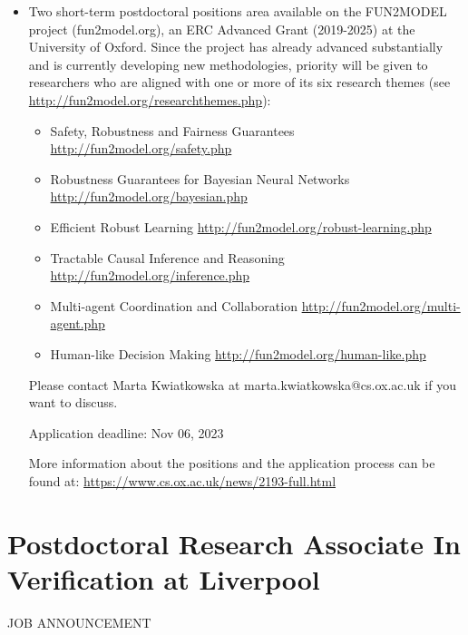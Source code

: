 \documentclass[prodmode,acmtecs]{acmsmall} %
\begin{document}
\begin{itemize}\item   Two short-term postdoctoral positions area available on the FUN2MODEL project (fun2model.org), an ERC Advanced Grant (2019-2025) at the University of Oxford. Since the project has already advanced substantially and is currently developing new methodologies, priority will be given to researchers who are aligned with one or more of its six research themes (see \href{http://fun2model.org/researchthemes.php}{http://fun2model.org/researchthemes.php}): 
 
\begin{itemize}\item  Safety, Robustness and Fairness Guarantees \href{http://fun2model.org/safety.php}{http://fun2model.org/safety.php}
\item  Robustness Guarantees for Bayesian Neural Networks \href{http://fun2model.org/bayesian.php}{http://fun2model.org/bayesian.php}
\item  Efficient Robust Learning \href{http://fun2model.org/robust-learning.php}{http://fun2model.org/robust-learning.php}
\item  Tractable Causal Inference and Reasoning \href{http://fun2model.org/inference.php}{http://fun2model.org/inference.php}
\item  Multi-agent Coordination and Collaboration \href{http://fun2model.org/multi-agent.php}{http://fun2model.org/multi-agent.php}
\item  Human-like Decision Making \href{http://fun2model.org/human-like.php}{http://fun2model.org/human-like.php}
\end{itemize} 
  Please contact Marta Kwiatkowska at marta.kwiatkowska@cs.ox.ac.uk if you want to discuss. 
 
Application deadline: Nov 06, 2023 
 
  More information about the positions and the application process can be found at: \href{https://www.cs.ox.ac.uk/news/2193-full.html}{https://www.cs.ox.ac.uk/news/2193-full.html} 
 
\end{itemize}\section{Postdoctoral Research Associate In Verification at Liverpool}\label{PostdoctoralResearchAssociateInVerificationatLiverpool}JOB ANNOUNCEMENT 
\end{document}
